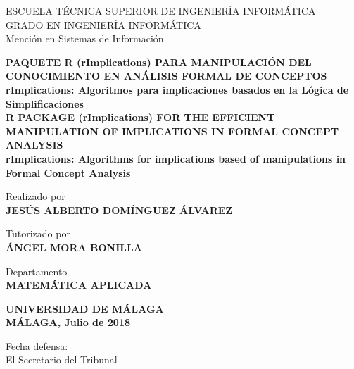 \newpage
\thispagestyle{empty}
\mbox{}
\newpage
\thispagestyle{empty}
\mbox{}

\begin{titlepage}

    \begin{center}
		\normalsize {
            ESCUELA T\'ECNICA SUPERIOR DE INGENIER\'IA INFORM\'ATICA \\
            GRADO EN INGENIER\'IA INFORM\'ATICA \\
            Menci\'on en Sistemas de Informaci\'on \\}
	\end{center}

    \bigskip

    \begin{center}
		\normalsize {\textbf{
            PAQUETE R (rImplications) PARA MANIPULACI\'ON DEL CONOCIMIENTO 
            EN AN\'ALISIS FORMAL DE CONCEPTOS\\ 
            rImplications: Algoritmos para implicaciones basados
            en la L\'ogica de Simplificaciones\\ 
            R PACKAGE (rImplications) FOR THE EFFICIENT MANIPULATION OF
            IMPLICATIONS IN FORMAL CONCEPT ANALYSIS \\
            rImplications: Algorithms for implications based
            of manipulations in Formal Concept Analysis
            }}
    \end{center}
    
    \smallskip

    \begin{center}
		\normalsize {
            Realizado por \\ \textbf{JES\'US ALBERTO DOM\'INGUEZ \'ALVAREZ}}
    \end{center}

    \begin{center}
		\normalsize {
            Tutorizado por \\ \textbf{\'ANGEL MORA BONILLA}}
    \end{center}

    \begin{center}
		\normalsize {
            Departamento \\ \textbf{MATEM\'ATICA APLICADA}}
    \end{center}

    \begin{center}
		\normalsize {
            \textbf{UNIVERSIDAD DE M\'ALAGA \\ M\'ALAGA, Julio de 2018}}
    \end{center}

    \bigskip

    \bigskip

    \begin{flushleft}
		\normalsize {
            Fecha defensa: \\ El Secretario del Tribunal}
    \end{flushleft}

\end{titlepage}

\newpage
\thispagestyle{empty}
\mbox{}

\newpage